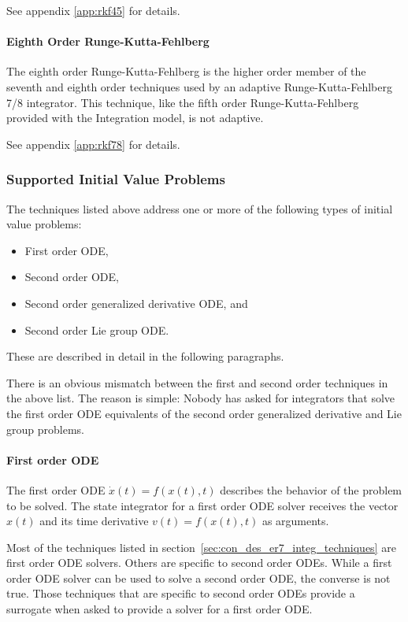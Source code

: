 See appendix \ref{app:rkf45} for details.

\paragraph{Eighth Order Runge-Kutta-Fehlberg}
The eighth order Runge-Kutta-Fehlberg is the higher order member of the seventh
and eighth order techniques used by an adaptive Runge-Kutta-Fehlberg 7/8
integrator. This technique, like the fifth order Runge-Kutta-Fehlberg provided
with the \erseven Integration model, is not adaptive.

See appendix \ref{app:rkf78} for details.

\subsubsection{Supported Initial Value Problems}

The techniques listed above address one or more of the following types of
initial value problems:\begin{itemize}
\item First order ODE,
\item Second order ODE,
\item Second order generalized derivative ODE, and
\item Second order Lie group ODE.
\end{itemize}
These are described in detail in the following paragraphs.

There is an obvious mismatch between the first and second order techniques
in the above list. The reason is simple: Nobody has asked for integrators
that solve the first order ODE equivalents of the second order generalized
derivative and Lie group problems.

\paragraph{First order ODE}
The first order ODE $\dot x(t) = f(x(t),t)$
describes the behavior of the problem to be solved.
The state integrator for a first order ODE solver
receives the vector $x(t)$ and its time derivative $v(t)=f(x(t),t)$
as arguments.

Most of the techniques listed in section~\ref{sec:con_des_er7_integ_techniques}
are first order ODE solvers. Others are specific to second order ODEs. While a
first order ODE solver can be used to solve a second order ODE, the converse
is not true. Those techniques that are specific to second order ODEs provide
a surrogate when asked to provide a solver for a first order ODE.

